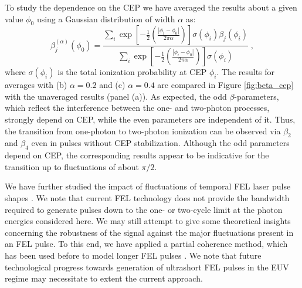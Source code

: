 To study the dependence on the CEP we have averaged the results about a given value $\phi_0$ using a Gaussian distribution of width $\alpha$ as: 
%
\begin{equation}
\beta_j^{(\alpha)}(\phi_0) 
= 
\frac{\sum_i \exp\left[-\frac{1}{2}\left(\frac{|\phi_i-\phi_0|}{2\pi\alpha}\right)\right] \sigma(\phi_i) \beta_j(\phi_i)}
{\sum_i\exp\left[-\frac{1}{2}\left(\frac{|\phi_i-\phi_0|}{2\pi\alpha}\right)\right] \sigma(\phi_i)}\; ,
    \label{eq:gauss_window}
\end{equation}
%
where $\sigma(\phi_i)$ is the total ionization probability at CEP $\phi_i$. The results for averages with (b) $\alpha = 0.2$ and (c) $\alpha = 0.4$ are compared in Figure \ref{fig:beta_cep} with the unaveraged results (panel (a)). As expected, the odd $\beta$-parameters, which reflect the interference between the one- and two-photon processes, strongly depend on CEP, while the even parameters are independent of it. Thus, the transition from one-photon to two-photon ionization can be observed via $\beta_2$ and $\beta_4$ even in pulses without CEP stabilization. Although the odd parameters depend on CEP, the corresponding results appear to be indicative for the transition up to fluctuations of about $\pi/2$.

We have further studied the impact of fluctuations of temporal FEL laser pulse shapes \cite{mitzner08}. We note that current FEL technology does not provide the bandwidth required to generate pulses down to the one- or two-cycle limit at the photon energies considered here. We may still attempt to give some theoretical insights concerning the robustness of the signal against the major fluctuations present in an FEL pulse. To this end, we have applied a partial coherence method, which has been used before to model longer FEL pulses \cite{pfeiffer10}. We note that future technological progress towards generation of ultrashort FEL pulses in the EUV regime may necessitate to extent the current approach.

